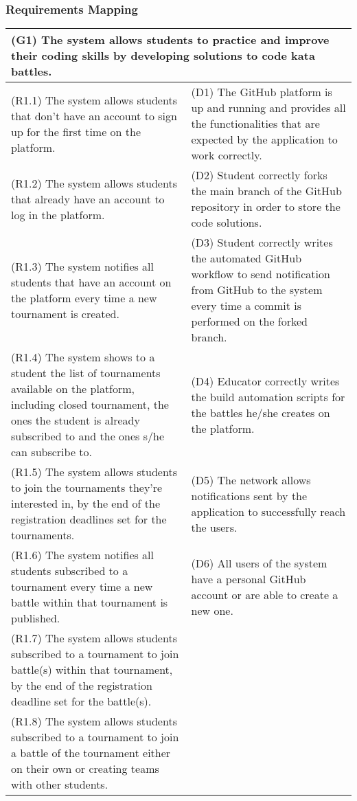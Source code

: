 \subsubsection{Requirements Mapping}

\hspace{0.5cm}

\begin{longtable}{|p{8cm}|p{8cm}|}
\hline
\multicolumn{2}{|p{16cm}|}{\textbf{(G1) The system allows students to practice and improve their coding skills by developing solutions to code kata battles.}}\\
\hline
(R1.1) The system allows students that don't have an account to sign up for the first time on the platform. & (D1) The GitHub platform is up and running and provides all the functionalities that are expected by the application to work correctly. \\
(R1.2) The system allows students that already have an account to log in the platform. & (D2) Student correctly forks the main branch of the GitHub repository in order to store the code solutions. \\
(R1.3) The system notifies all students that have an account on the platform every time a new tournament is created. & (D3) Student correctly writes the automated GitHub workflow to send notification from GitHub to the system every time a commit is performed on the forked branch. \\
(R1.4) The system shows to a student the list of tournaments available on the platform, including closed tournament, the ones the student is already subscribed to and the ones s/he can subscribe to. & (D4) Educator correctly writes the build automation scripts for the battles he/she creates on the platform. \\
(R1.5) The system allows students to join the tournaments they’re interested in, by the end of the registration deadlines set for the tournaments. & (D5) The network allows notifications sent by the application to successfully reach the users. \\
(R1.6) The system notifies all students subscribed to a tournament every time a new battle within that tournament is published. & (D6) All users of the system have a personal GitHub account or are able to create a new one.\\
 (R1.7) The system allows students subscribed to a tournament to join battle(s) within that tournament, by the end of the registration deadline set for the battle(s). & \\
 (R1.8) The system allows students subscribed to a tournament to join a battle of the tournament either on their own or creating teams with other students. & \\

\end{longtable}
